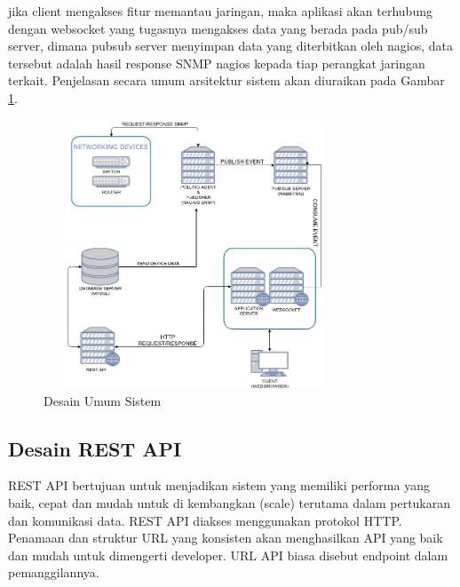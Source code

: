 			jika client mengakses fitur memantau jaringan, maka aplikasi akan terhubung dengan websocket yang tugasnya mengakses data yang berada pada pub/sub server, dimana pubsub server menyimpan data yang diterbitkan oleh nagios, data tersebut adalah hasil response SNMP nagios kepada tiap perangkat jaringan terkait.
			Penjelasan secara umum arsitektur sistem akan diuraikan pada Gambar \ref{DesainUmumSistem}.
            \begin{figure}[H]
				\centering
				\includegraphics[width=9cm,height=8cm]{Images/C-3/main.png}
				\caption{Desain Umum Sistem}
				\label{DesainUmumSistem}
			\end{figure}

		\subsection{Desain REST API}
            	REST API bertujuan untuk menjadikan sistem yang memiliki performa yang baik, cepat dan mudah untuk di kembangkan (scale) terutama dalam pertukaran dan komunikasi data. REST API diakses menggunakan protokol HTTP. Penamaan dan struktur URL yang konsisten akan menghasilkan API yang baik dan mudah untuk dimengerti developer. URL API biasa disebut endpoint dalam pemanggilannya.
            	
